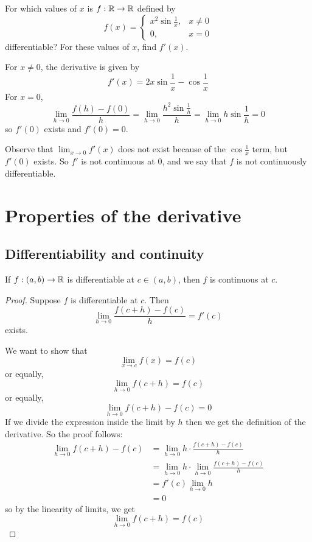 \begin{eg}
  For which values of $x$ is $f : \mathbb{R} \to \mathbb{R}$ defined by 
  \[
    f(x) = 
    \begin{cases}
      x ^ 2 \sin \frac{1}{x}, & x \neq 0 \\ 
      0, & x = 0
    \end{cases}
  \]
  differentiable? For these values of $x$, find $f'(x)$.
\end{eg}
\begin{solution}
  For $x \neq 0$, the derivative is given by
  \[
    f'(x) = 2x \sin \frac{1}{x} - \cos \frac{1}{x}
  \]
  For $x = 0$, 
  \[
    \lim_{h \to 0} \frac{f(h) - f(0)}{h} = \lim_{h \to 0} \frac{h ^ 2 \sin \frac{1}{h}}{h} = \lim_{h \to 0} h \sin \frac{1}{h} = 0
  \]
  so $f'(0)$ exists and $f'(0) = 0$.
\end{solution}
\begin{remark}
  Observe that $\lim_{x \to 0} f'(x)$ does not exist because of the $\cos \frac{1}{x}$ term, but $f'(0)$ exists. So $f'$ is not continuous at 0, and we say that $f$ is not continuously differentiable.
\end{remark}


\section{Properties of the derivative}


\subsection{Differentiability and continuity}
\begin{theorem}[Continuity]
  \label{thm:differentiability-implies-continuity}
  If $f: (a, b) \to \mathbb{R}$ is differentiable at $c \in (a, b)$, then $f$ is continuous at $c$.
\end{theorem}
\begin{proof}
  Suppose $f$ is differentiable at $c$. Then
  \[
    \lim_{h \to 0} \frac{f(c + h) - f(c)}{h} = f'(c)
  \]
  exists.

  We want to show that
  \[
    \lim_{x \to c} f(x) = f(c)
  \]
  or equally,
  \[
    \lim_{h \to 0} f(c + h) = f(c)
  \]
  or equally,
  \[
    \lim_{h \to 0} f(c + h) - f(c) = 0
  \]
  If we divide the expression inside the limit by $h$ then we get the definition of the derivative. So the proof follows:
  \begin{align*}
    \lim_{h \to 0} f(c + h) - f(c) &= \lim_{h \to 0} h \cdot \frac{f(c + h) - f(c)}{h} \\ 
    &= \lim_{h \to 0} h \cdot \lim_{h \to 0} \frac{f(c + h) - f(c)}{h} \\ 
    &= f'(c) \lim_{h \to 0} h \\ 
    &= 0
  \end{align*}
  so by the linearity of limits, we get 
  \[
    \lim_{h \to 0} f(c + h) = f(c)
  \]
\end{proof}

